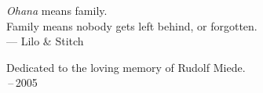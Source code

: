 \thispagestyle{empty}

\vspace*{3cm}

\begin{center}
\emph{Ohana} means family. \\
Family means nobody gets left behind, or forgotten. \\ \medskip
--- Lilo \& Stitch    
\end{center}

\medskip

\begin{center}
Dedicated to the loving memory of Rudolf Miede. \\ \,--\,2005
\end{center}